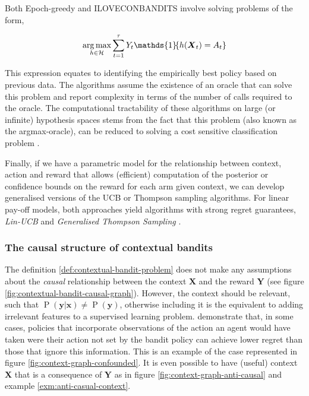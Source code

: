 \documentclass[11pt,a4paper,twoside]{report}
\newcommand{\set}[1]{\left\{#1\right\}}
\newcommand{\ind}[1]{\mathds{1}\!\!\set{#1}}
\newcommand{\argmax}{\operatornamewithlimits{arg\,max}}
\newcommand{\eqn}[1]{\begin{align}#1\end{align}}
\renewcommand{\P}[1]{\operatorname{P}\left(#1\right)}
\renewcommand{\vec}[1]{\boldsymbol{#1}}
\theoremstyle{plain}
\theoremstyle{definition}
\begin{document}
Both Epoch-greedy and ILOVECONBANDITS involve solving problems of the form,

\eqn{
\argmax_{h \in \mathcal{H}} \sum_{t=1}^\tau Y_t \ind{h(\vec{X}_t) = A_t}
}

This expression equates to identifying the empirically best policy based on previous data. The algorithms assume the existence of an oracle that can solve this problem and report complexity in terms of the number of calls required to the oracle. The computational tractability of these algorithms on large (or infinite) hypothesis spaces stems from the fact that this problem (also known as the argmax-oracle), can be reduced to solving a cost sensitive classification problem \citep{Dudik2011a}. 

Finally, if we have a parametric model for the relationship between context, action and reward that allows (efficient) computation of the posterior or confidence bounds on the reward for each arm given context, we can develop generalised versions of the UCB or Thompson sampling algorithms. For linear pay-off models, both approaches yield algorithms with strong regret guarantees, \emph{Lin-UCB} \citep{li2010contextual} and \emph{Generalised Thompson Sampling} \citep{Agrawal2013}. 

\subsubsection{The causal structure of contextual bandits}
\label{sec:causal-structure-contextual-bandit}

The definition \ref{def:contextual-bandit-problem} does not make any assumptions about the \emph{causal} relationship between the context $\vec{X}$ and the reward $\vec{Y}$ (see figure \ref{fig:contextual-bandit-causal-graph}). However, the context should be relevant, such that $\P{\vec{y}|\vec{x}} \neq \P{\vec{y}}$, otherwise including it is the equivalent to adding irrelevant features to a supervised learning problem. \citet{Bareinboim2015} demonstrate that, in some cases, policies that incorporate observations of the action an agent would have taken were their action not set by the bandit policy can achieve lower regret than those that ignore this information. This is an example of the case represented in figure \ref{fig:context-graph-confounded}. It is even possible to have (useful) context $\vec{X}$ that is a consequence of $\vec{Y}$ as in figure \ref{fig:context-graph-anti-causal} and example \ref{exm:anti-casual-context}.
\end{document}
